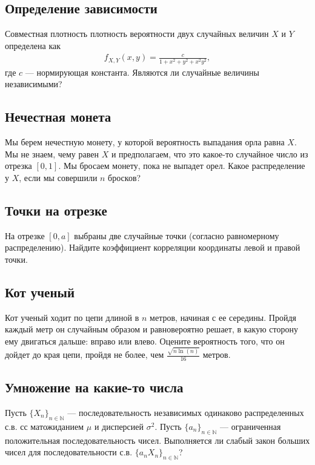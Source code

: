 \documentclass[12pt]{article}
\newcommand\N{\mathbb{N}}
\begin{document}
\subsection{Определение зависимости}

Совместная плотность плотность вероятности двух случайных величин $X$ и $Y$ определена как
\begin{align*}
    f_{X, Y}(x, y) = \frac{c}{1 + x^2 + y^2 + x^2y^2},
\end{align*}
где $c$ --- нормирующая константа. Являются ли случайные величины независимыми?



\subsection{Нечестная монета}

Мы берем нечестную монету, у которой вероятность выпадания орла равна $X$. Мы не знаем, чему равен $X$ и предполагаем, что это какое-то случайное число из отрезка $[0, 1]$. Мы бросаем монету, пока не выпадет орел. Какое распределение у $X$, если мы совершили $n$ бросков?



\subsection{Точки на отрезке}

На отрезке $[0, a]$ выбраны две случайные точки (согласно равномерному распределению). Найдите коэффициент корреляции координаты левой и правой точки. 



\subsection{Кот ученый}

Кот ученый ходит по цепи длиной в $n$ метров, начиная с ее середины. Пройдя каждый метр он случайным образом и равновероятно решает, в какую сторону ему двигаться дальше: вправо или влево. Оцените вероятность того, что он дойдет до края цепи, пройдя не более, чем $\frac{\sqrt{n \ln(n)}}{16}$ метров.



\subsection{Умножение на какие-то числа}

Пусть $\{X_n\}_{n \in \N}$ --- последовательность независимых одинаково распределенных с.в. сс матожиданием $\mu$ и дисперсией $\sigma^2$. Пусть $\{a_n\}_{n \in \N}$ --- ограниченная положительная последовательность чисел. Выполняется ли слабый закон больших чисел для последовательности с.в. $\{a_n X_n\}_{n \in \N}$?
\end{document}
